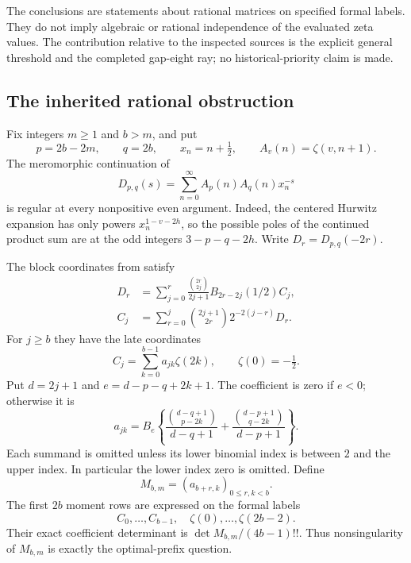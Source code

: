 \documentclass[11pt,a4paper]{article}
\numberwithin{equation}{section}
\theoremstyle{definition}
\theoremstyle{remark}
\begin{document}
The conclusions are statements about rational matrices on specified
formal labels.  They do not imply algebraic or rational independence
of the evaluated zeta values.  The contribution relative to the
inspected sources is the explicit general threshold and the completed
gap-eight ray; no historical-priority claim is made.

\subsection{The inherited rational obstruction}

Fix integers $m\ge1$ and $b>m$, and put
\[
 p=2b-2m,\qquad q=2b,\qquad x_n=n+\tfrac12,
 \qquad A_v(n)=\zeta(v,n+1).
\]
The meromorphic continuation of
\[
 D_{p,q}(s)=\sum_{n=0}^{\infty}A_p(n)A_q(n)x_n^{-s}
\]
is regular at every nonpositive even argument.  Indeed, the centered
Hurwitz expansion has only powers $x_n^{1-v-2h}$, so the possible
poles of the continued product sum are at the odd integers
$3-p-q-2h$.  Write $D_r=D_{p,q}(-2r)$.

The block coordinates from \cite{OrderedIncoming,GapSix} satisfy
\begin{align}
 D_r&=\sum_{j=0}^r\frac{\binom{2r}{2j}}{2j+1}
             B_{2r-2j}(1/2)C_j,\label{eg:forward}\\
 C_j&=\sum_{r=0}^j\binom{2j+1}{2r}2^{-2(j-r)}D_r.
 \label{eg:inverse}
\end{align}
For $j\ge b$ they have the late coordinates
\[
 C_j=\sum_{k=0}^{b-1}a_{jk}\zeta(2k),\qquad \zeta(0)=-\tfrac12.
\]
Put $d=2j+1$ and $e=d-p-q+2k+1$.  The coefficient is zero
if $e<0$; otherwise it is
\begin{equation}\label{eg:late-entry}
 a_{jk}=B_e\left\{
       \frac{\binom{d-q+1}{p-2k}}{d-q+1}
      +\frac{\binom{d-p+1}{q-2k}}{d-p+1}\right\}.
\end{equation}
Each summand is omitted unless its lower binomial index is between
$2$ and the upper index.  In particular the lower index zero is
omitted.  Define
\[
 M_{b,m}=(a_{b+r,k})_{0\le r,k<b}.
\]
The first $2b$ moment rows are expressed on the formal labels
\[
 C_0,\ldots,C_{b-1},\quad\zeta(0),\ldots,\zeta(2b-2).
\]
Their exact coefficient determinant is $\det M_{b,m}/(4b-1)!!$.
Thus nonsingularity of $M_{b,m}$ is exactly the optimal-prefix question.
\end{document}
